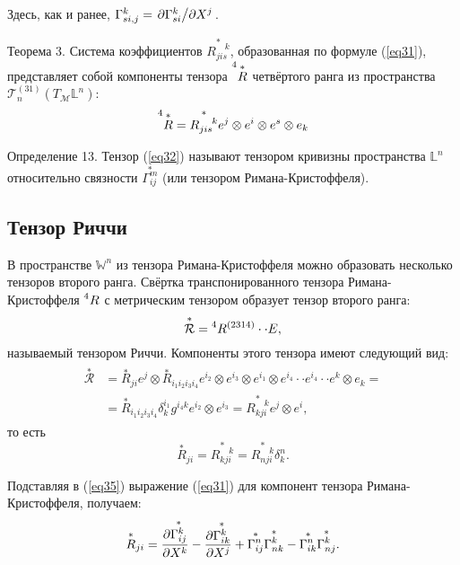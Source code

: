 \documentclass[14pt,a4paper]{scrartcl}
\begin{document}
Здесь, как и ранее, $\Gamma_{si,j}^k = \pdv*{\Gamma_{si}^k}{X^j}$.


Теорема 3. Система коэффициентов $\overset{*}{R_{jis}^{\quad k}}$, образованная по формуле (\ref{eq31}), представляет собой компоненты тензора $\prescript{4}{}{\overset{*}{R}}$ четвёртого ранга из пространства $\mathcal{T}_n^{(31)} (T_\mathcal{M} \mathbb{L}^n)$:
\begin{equation}\label{eq32}
	\prescript{4}{}{\overset{*}{R}} = \overset{*}{R_{jis}^{\quad k}} e^j \otimes e^i \otimes e^s \otimes e_k
\end{equation}


Определение 13. Тензор (\ref{eq32}) называют тензором кривизны пространства $\mathbb{L}^n$ относительно связности $\overset{*}{\Gamma_{ij}^m}$ (или тензором Римана-Кристоффеля).


\subsection{Тензор Риччи}
В пространстве $\mathbb{W}^n$ из тензора Римана-Кристоффеля можно образовать несколько тензоров второго ранга. Свёртка транспонированного тензора Римана-Кристоффеля $\prescript{4}{}{R}$ с метрическим тензором образует тензор второго ранга:
\begin{equation}\label{eq33}
	\overset{*}{\mathcal{R}} = \prescript{4}{}{R}^{(2314)} \cdot \cdot E,
\end{equation}
называемый тензором Риччи. Компоненты этого тензора имеют следующий вид:
\begin{align}\label{eq34}
\begin{split}
	\overset{*}{\mathcal{R}} &= \overset{*}{R}_{ji}e^j \otimes \overset{*}{R}_{i_1i_2i_3i_4} e^{i_2} \otimes e^{i_3} \otimes e^{i_1} \otimes e^{i_4} \cdot \cdot e^{i_4} \cdot \cdot e^k \otimes e_k = \\
	&= \overset{*}{R}_{i_1i_2i_3i_4} \delta_k^{i_1}g^{i_4k}e^{i_2} \otimes e^{i_3} = \overset{*}{R_{kji}^{\quad k}} e^j \otimes e^i,
\end{split}
\end{align}
то есть
\begin{equation}\label{eq35}
	\overset{*}{R}_{ji} = \overset{*}{R_{kji}^{\quad k}} = \overset{*}{R_{nji}^{\quad k}}  \delta_k^n.
\end{equation}


Подставляя в (\ref{eq35}) выражение (\ref{eq31}) для компонент тензора Римана-Кристоффеля, получаем:
\begin{equation}\label{eq36}
	\overset{*}{R}_{ji} = \pdv{\overset{*}{\Gamma_{ij}^k}}{X^k} - \pdv{\overset{*}{\Gamma_{ik}^k}}{X^j} + \overset{*}{\Gamma_{ij}^n} \overset{*}{\Gamma_{nk}^k} - \overset{*}{\Gamma_{ik}^n} \overset{*}{\Gamma_{nj}^k}.
\end{equation}
\end{document}
